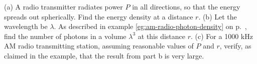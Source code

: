 (a) A radio transmitter radiates power $P$ in all directions, so that the energy spreads out spherically.
Find the energy density at a distance $r$.\answercheck\hwendpart
(b) Let the wavelength be $\lambda$.
As described in example \ref{eg:am-radio-photon-density} on p.~\pageref{eg:am-radio-photon-density},
find the number of photons in a volume $\lambda^3$ at this distance $r$.\answercheck\hwendpart
(c) For a 1000 kHz AM radio transmitting station, assuming reasonable values of $P$ and $r$,
verify, as claimed in the example,
that the result from part b is very large.
